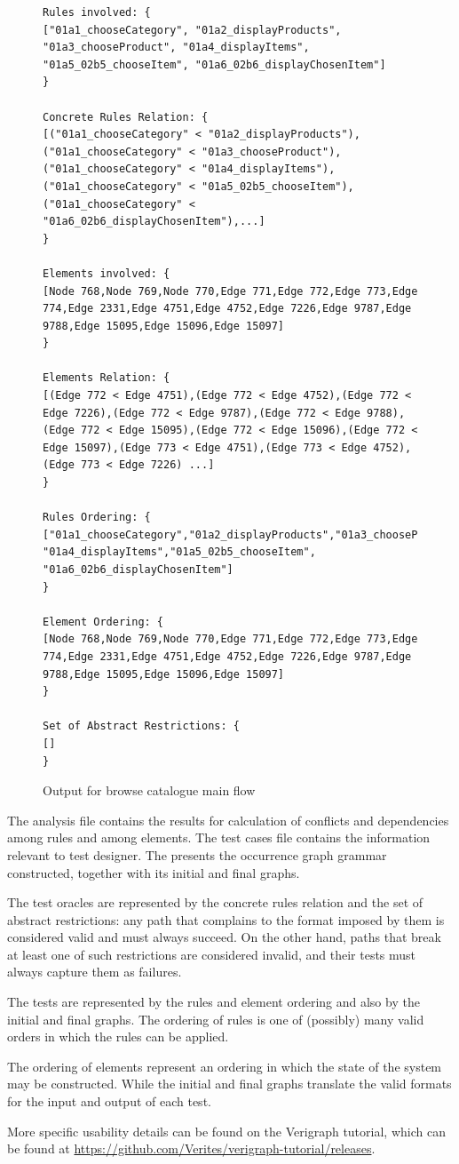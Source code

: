 \begin{figure}[!ht]
\caption{Output for browse catalogue main flow}
\begin{verbatim}
Rules involved: {
["01a1_chooseCategory", "01a2_displayProducts", "01a3_chooseProduct", "01a4_displayItems", "01a5_02b5_chooseItem", "01a6_02b6_displayChosenItem"]
}

Concrete Rules Relation: {
[("01a1_chooseCategory" < "01a2_displayProducts"), ("01a1_chooseCategory" < "01a3_chooseProduct"), ("01a1_chooseCategory" < "01a4_displayItems"), ("01a1_chooseCategory" < "01a5_02b5_chooseItem"), ("01a1_chooseCategory" < "01a6_02b6_displayChosenItem"),...]
}

Elements involved: {
[Node 768,Node 769,Node 770,Edge 771,Edge 772,Edge 773,Edge 774,Edge 2331,Edge 4751,Edge 4752,Edge 7226,Edge 9787,Edge 9788,Edge 15095,Edge 15096,Edge 15097]
}

Elements Relation: {
[(Edge 772 < Edge 4751),(Edge 772 < Edge 4752),(Edge 772 < Edge 7226),(Edge 772 < Edge 9787),(Edge 772 < Edge 9788),(Edge 772 < Edge 15095),(Edge 772 < Edge 15096),(Edge 772 < Edge 15097),(Edge 773 < Edge 4751),(Edge 773 < Edge 4752),(Edge 773 < Edge 7226) ...]
}

Rules Ordering: {
["01a1_chooseCategory","01a2_displayProducts","01a3_chooseProduct", "01a4_displayItems","01a5_02b5_chooseItem", "01a6_02b6_displayChosenItem"]
}

Element Ordering: {
[Node 768,Node 769,Node 770,Edge 771,Edge 772,Edge 773,Edge 774,Edge 2331,Edge 4751,Edge 4752,Edge 7226,Edge 9787,Edge 9788,Edge 15095,Edge 15096,Edge 15097]
}

Set of Abstract Restrictions: {
[]
}
\end{verbatim}
  \label{fig:tests:relation}
\end{figure}
The analysis file contains the results for calculation of conflicts and dependencies among rules and among elements. The test cases file contains the information relevant to test designer.
The  presents the occurrence graph grammar constructed, together with its initial and final graphs.

The test oracles are represented by the concrete rules relation and the set of abstract restrictions: any path that complains to the format imposed by them is considered valid and must always succeed. On the other hand, paths that break at least one of such restrictions are considered invalid, and their tests must always capture them as failures.

The tests are represented by the rules and element ordering and also by the initial and final graphs. The ordering of rules is one of (possibly) many valid orders in which the rules can be applied.

The ordering of elements represent an ordering in which the state of the system may be constructed. While the initial and final graphs translate the valid formats for the input and output of each test.

More specific usability details can be found on the Verigraph tutorial, which can be found at \url{https://github.com/Verites/verigraph-tutorial/releases}.

